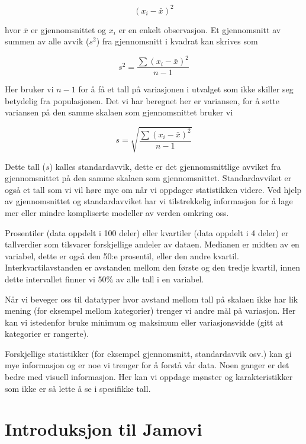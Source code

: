\documentclass[
  letterpaper,
  DIV=11,
  numbers=noendperiod,
  oneside]{scrreprt}
\begin{document}
\[(x_i-\bar{x})^2\]

hvor \(\bar{x}\) er gjennomsnittet og \(x_i\) er en enkelt observasjon.
Et gjennomsnitt av summen av alle avvik (\(s^2\)) fra gjennomsnitt i
kvadrat kan skrives som

\[s^2 = \frac{\sum{(x_i-\bar{x})^2}}{n-1}\]

Her bruker vi \(n-1\) for å få et tall på variasjonen i utvalget som
ikke skiller seg betydelig fra populasjonen. Det vi har beregnet her er variansen,
for å sette variansen på den samme skalaen som gjennomsnittet bruker vi

\[s = \sqrt{\frac{\sum{(x_i-\bar{x})^2}}{n-1}}\]

Dette tall (\(s\)) kalles standardavvik, dette er det gjennomsnittlige
avviket fra gjennomsnittet på den samme skalaen som gjennomsnittet.
Standardavviket er også et tall som vi vil høre mye om når vi oppdager
statistikken videre. Ved hjelp av gjennomsnittet og standardavviket har
vi tilstrekkelig informasjon for å lage mer eller mindre kompliserte
modeller av verden omkring oss.

Prosentiler (data oppdelt i 100 deler) eller kvartiler (data oppdelt i 4
deler) er tallverdier som tilsvarer forskjellige andeler av dataen.
Medianen er midten av en variabel, dette er også den 50:e prosentil,
eller den andre kvartil. Interkvartilavstanden er avstanden mellom den
første og den tredje kvartil, innen dette intervallet finner vi 50\% av
alle tall i en variabel.

Når vi beveger oss til datatyper hvor avstand mellom tall på skalaen
ikke har lik mening (for eksempel mellom kategorier) trenger vi andre
mål på variasjon. Her kan vi istedenfor bruke minimum og maksimum eller
variasjonsvidde (gitt at kategorier er rangerte).

Forskjellige statistikker (for eksempel gjennomsnitt, standardavvik
osv.) kan gi mye informasjon og er noe vi trenger for å forstå vår data.
Noen ganger er det bedre med visuell informasjon. Her kan vi oppdage
mønster og karakteristikker som ikke er så lette å se i spesifikke tall.

\hypertarget{introduksjon-til-jamovi}{%
\section{Introduksjon til Jamovi}\label{introduksjon-til-jamovi}}
\end{document}

